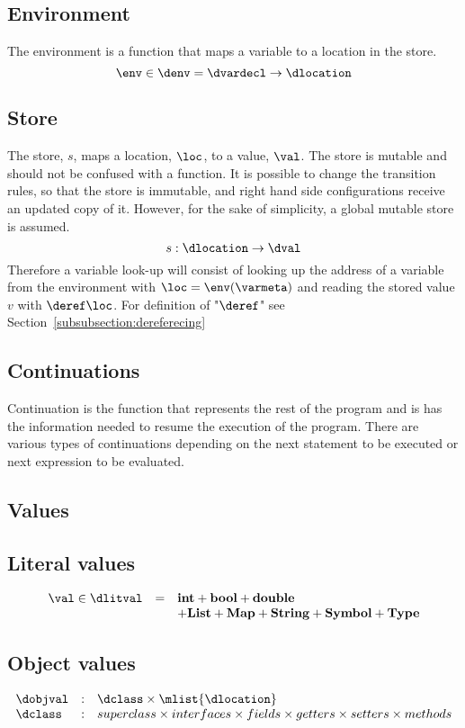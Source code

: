 \documentclass{article}
\begin{document}
\subsection{Environment}
\label{subsec:env-definition}
The environment is a function that maps a variable to a location in the store.
\[\env \in \denv = \dvardecl \rightarrow \dlocation\] 
\subsection{Store}
\label{subsec:store-definition}
The store, $s$, maps a location, $\loc$, to a value, $\val$. The store is mutable and should not be confused with a function. It is possible to change the transition rules, so that the store is immutable, and right hand side configurations receive an updated copy of it. However, for the sake of simplicity, a global mutable store is assumed. 
\[s : \dlocation \rightarrow \dval \]
Therefore a variable look-up will consist of looking up the address of a variable from the environment with $\loc = \env(\varmeta)$ and reading the stored value $v$ with $\deref\loc$. For definition of "$\deref$" see Section~\ref{subsubsection:dereferecing} 

\subsection{Continuations}
\label{subsec:continuations-definition}

Continuation is the function that represents the rest of the program and is has the information needed to resume the execution of the program. 
There are various types of continuations depending on the next statement to be executed or next expression to be evaluated.

\subsection{Values}
\label{subsec:values}
\subsection{Literal values}
\label{subsubsec:literal-values}
\[
  \begin{array}{lcl}
	\val \in \dlitval &=& \mathbf{int} + \mathbf{bool} + \mathbf{double}\\
	&& + \mathbf{List} + \mathbf{Map} + \mathbf{String} + \mathbf{Symbol} + \mathbf{Type}
  \end{array}
\]
\subsection{Object values}
\label{subsec:object-values}
\[
  \begin{array}{lcl}
	\dobjval &:& \dclass \times \mlist{\dlocation}\\
	\dclass &:& superclass \times interfaces \times fields \times getters \times setters \times methods
  \end{array}
\]
\end{document}
